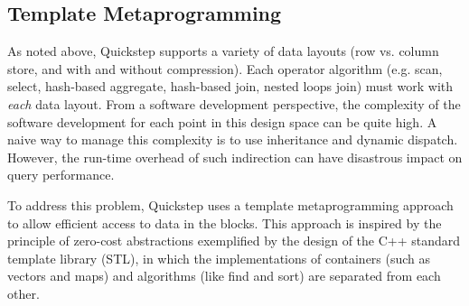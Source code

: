
\subsection{Template Metaprogramming}
\label{vectorization}

As noted above, Quickstep supports a variety of data layouts (row vs. column store, and with and without compression). Each operator algorithm (e.g. scan, select, hash-based aggregate, hash-based join, nested loops join) must work with \textit{each} data layout. From a software development perspective, the complexity of the software development for each point in this design space can be quite high. A naive way to manage this complexity is to use inheritance and dynamic dispatch. However, the run-time overhead of such indirection can have disastrous impact on query performance. %

To address this problem, Quickstep uses a template metaprogramming approach to allow efficient access to data in the blocks. This approach is inspired by the principle of zero-cost abstractions exemplified by the design of the C++ standard template library (STL), %
in which the implementations of containers (such as vectors and maps) and algorithms (like find and sort) are separated from each other.


